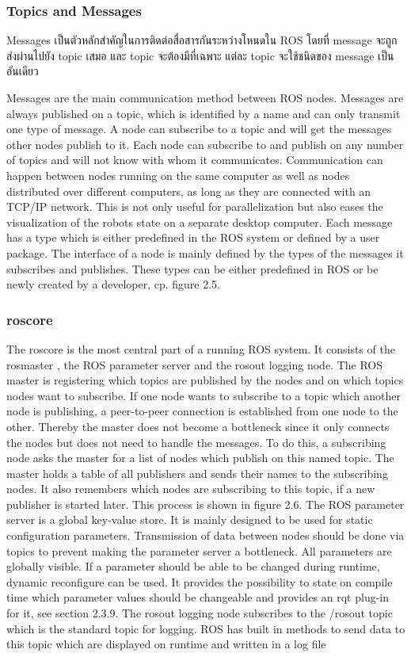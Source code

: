 \subsubsection*{Topics and Messages}
Messages เป็นตัวหลักสำคัญในการติดต่อสื่อสารกันระหว่างโหนดใน ROS โดยที่ message จะถูกส่งผ่านไปยัง topic เสมอ
และ topic จะต้องมีที่เฉพาะ แต่ละ topic จะใช้ชนิดของ message เป็นอันเดียว 

Messages are the main communication method between ROS nodes.  Messages are
always published on a topic, which is identified by a name and can only transmit
one  type  of  message.   A  node  can  subscribe  to  a  topic  and  will  get  the  messages
other nodes publish to it.  Each node can subscribe to and publish on any number
of topics and will not know with whom it communicates.
Communication can happen between nodes running on the same computer as well
as nodes distributed over different computers,  as long as they are connected with
an TCP/IP network.  This is not only useful for parallelization but also eases the
visualization of the robots state on a separate desktop computer.  Each message has
a type which is either predefined in the ROS system or defined by a user package.
The interface of a node is mainly defined by the types of the messages it subscribes
and publishes.  These types can be either predefined in ROS or be newly created by
a developer, cp.  figure 2.5.

\subsubsection*{roscore}
The
roscore
is the most central part of a running ROS system.  It consists of the
rosmaster
,  the  ROS  parameter  server  and  the
rosout
logging  node.   The  ROS
master is registering which topics are published by the nodes and on which topics
nodes want to subscribe.  If one node wants to subscribe to a topic which another
node is publishing,  a peer-to-peer connection is established from one node to the
other.  Thereby the master does not become a bottleneck since it only connects the
nodes but does not need to handle the messages.  To do this, a subscribing node asks
the master for a list of nodes which publish on this named topic.  The master holds
a  table  of  all  publishers  and  sends  their  names  to  the  subscribing  nodes.   It  also
remembers which nodes are subscribing to this topic, if a new publisher is started
later.  This process is shown in figure 2.6.
The ROS parameter server is a global key-value store.  It is mainly designed to
be  used  for  static  configuration  parameters.   Transmission  of  data  between  nodes
should be done via topics to prevent making the parameter server a bottleneck.  All
parameters are globally visible.  If a parameter should be able to be changed during
runtime,  dynamic reconfigure can be used.  It provides the possibility to state on
compile  time  which  parameter  values  should  be  changeable  and  provides  an
rqt
plug-in for it, see section 2.3.9.  The
rosout
logging node subscribes to the
/rosout
topic which is the standard topic for logging.  ROS has built in methods to send
data to this topic which are displayed on runtime and written in a log file

